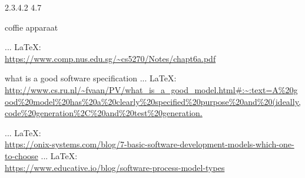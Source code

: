 \begin{thebibliography}{99}
{{{{{{2.3.4.2
4.7

coffie apparaat

 ... \LaTeX:\\ \url{https://www.comp.nus.edu.sg/~cs5270/Notes/chapt6a.pdf}



what is a good software specification
 ... \LaTeX:\\ \url{http://www.cs.ru.nl/~fvaan/PV/what_is_a_good_model.html#:~:text=A%20good%20model%20has%20a%20clearly%20specified%20purpose%20and%20(ideally,code%20generation%2C%20and%20test%20generation.}

 ... \LaTeX:\\ \url{https://onix-systems.com/blog/7-basic-software-development-models-which-one-to-choose}
 ... \LaTeX:\\ \url{https://www.educative.io/blog/software-process-model-types}

}}}}}}
\end{thebibliography}
